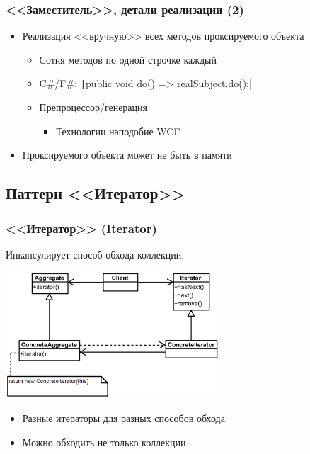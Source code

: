 \documentclass[xetex,mathserif,serif]{beamer}
\begin{document}
    \begin{frame}
        \frametitle{<<Заместитель>>, детали реализации (2)}
        \begin{itemize}
            \item Реализация <<вручную>> всех методов проксируемого объекта
            \begin{itemize}
                \item Сотня методов по одной строчке каждый
                \item C\#/F\#: \texttt|public void do() => realSubject.do();|
                \item Препроцессор/генерация
                \begin{itemize}
                    \item Технологии наподобие WCF
                \end{itemize}
            \end{itemize}
            \item Проксируемого объекта может не быть в памяти
        \end{itemize}
    \end{frame}

    \subsection{Паттерн <<Итератор>>}

    \begin{frame}
        \frametitle{<<Итератор>> (Iterator)}
        Инкапсулирует способ обхода коллекции.
        \begin{center}
            \includegraphics[width=0.6\textwidth]{iterator.png}
        \end{center}
        \begin{itemize}
            \item Разные итераторы для разных способов обхода
            \item Можно обходить не только коллекции
        \end{itemize}
    \end{frame}
\end{document}
